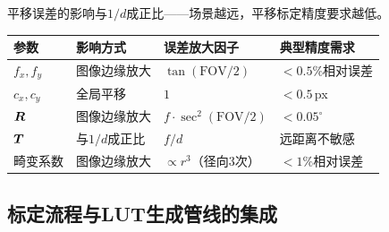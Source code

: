 平移误差的影响与$1/d$成正比——场景越远，平移标定精度要求越低。

\begin{corollary}[标定精度需求汇总]
\centering
\small
\begin{tabular}{p{3cm}p{3.5cm}p{3.5cm}p{3cm}}
\toprule
\textbf{参数} & \textbf{影响方式} & \textbf{误差放大因子} & \textbf{典型精度需求} \\
\midrule
$f_x, f_y$ & 图像边缘放大 & $\tan(\text{FOV}/2)$ & $<0.5\%$相对误差 \\
$c_x, c_y$ & 全局平移 & $1$ & $<0.5$\,px \\
$\bm{R}$   & 图像边缘放大 & $f\cdot\sec^2(\text{FOV}/2)$ & $<0.05^\circ$ \\
$\bm{T}$  & 与$1/d$成正比 & $f/d$ & 远距离不敏感 \\
畸变系数   & 图像边缘放大 & $\propto r^3$（径向3次） & $<1\%$相对误差 \\
\bottomrule
\end{tabular}
\label{tab:calib-precision}
\end{corollary}

\subsection{标定流程与LUT生成管线的集成}
\label{sec:calib-pipeline}

